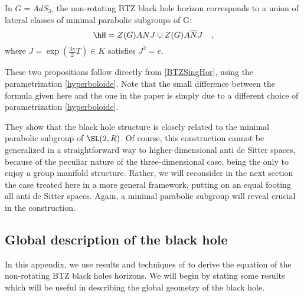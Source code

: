 \begin{proposition}		\label{PropLatClassANSLdeuxR}
	In $G=AdS_3$, the non-rotating BTZ black hole horizon corresponds to a union of lateral classes of minimal parabolic subgroups of G:
	\begin{equation}		\label{EqHorClassLatdeux}
		\hH = Z(G) A N J \cup Z(G) A \overline{N} J \quad,
	\end{equation}
	where $J=\exp(\frac{3\pi}{2}T) \in K$ satisfies $J^2 = e$.
	\label{BTZHor}
\end{proposition}

These two propositions follow directly from \eqref{BTZSingHor}, using the parametrization \eqref{hyperboloide}. Note that the small difference between the formula given here and the one in the paper \cite{Keio} is simply due to a different choice of parametrization \eqref{hyperboloide}.

They show that the black hole structure is closely related to the minimal parabolic subgroup of $\SL(2,R)$. Of course, this construction cannot be generalized in a straightforward way to higher-dimensional anti de Sitter spaces, because of the peculiar nature of the three-dimensional case, being the only to enjoy a group manifold structure. Rather, we will reconsider in the next section the case treated here in a more general framework, putting on an equal footing all anti de Sitter spaces. Again, a minimal parabolic subgroup will reveal crucial in the construction.

\subsection{Global description of the black hole}

In this appendix, we use results and techniques of \cite{BTZB_un,BTZB_deux,Keio,Clement} to derive the equation of the non-rotating BTZ black holes horizons. We will begin by stating some results which will be useful in describing the global geometry of the black hole.

